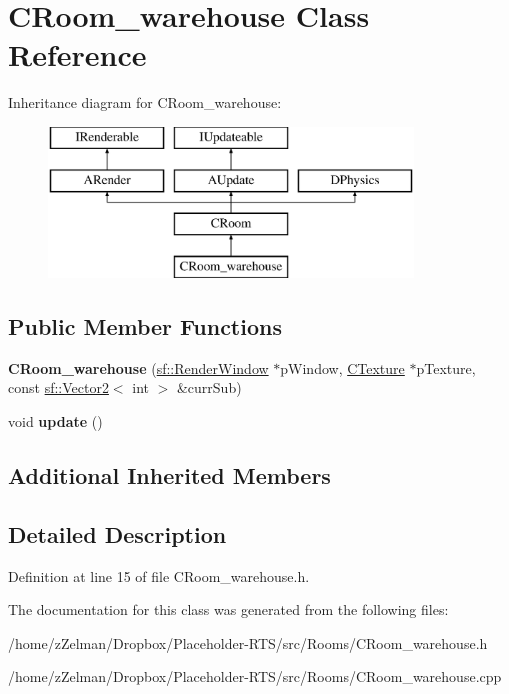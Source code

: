 \hypertarget{classCRoom__warehouse}{\section{C\-Room\-\_\-warehouse Class Reference}
\label{classCRoom__warehouse}
}
Inheritance diagram for C\-Room\-\_\-warehouse\-:\begin{figure}[H]
\begin{center}
\leavevmode
\includegraphics[height=4.000000cm]{classCRoom__warehouse}
\end{center}
\end{figure}
\subsection*{Public Member Functions}
\begin{DoxyCompactItemize}
\item 
\hypertarget{classCRoom__warehouse_a35f3177abad233838d301cee76d40901}{{\bfseries C\-Room\-\_\-warehouse} (\hyperlink{classsf_1_1RenderWindow}{sf\-::\-Render\-Window} $\ast$p\-Window, \hyperlink{classCTexture}{C\-Texture} $\ast$p\-Texture, const \hyperlink{classsf_1_1Vector2}{sf\-::\-Vector2}$<$ int $>$ \&curr\-Sub)}\label{classCRoom__warehouse_a35f3177abad233838d301cee76d40901}

\item 
\hypertarget{classCRoom__warehouse_ab4f3d3a87421ef23febd6f259341d4cd}{void {\bfseries update} ()}\label{classCRoom__warehouse_ab4f3d3a87421ef23febd6f259341d4cd}

\end{DoxyCompactItemize}
\subsection*{Additional Inherited Members}


\subsection{Detailed Description}


Definition at line 15 of file C\-Room\-\_\-warehouse.\-h.



The documentation for this class was generated from the following files\-:\begin{DoxyCompactItemize}
\item 
/home/z\-Zelman/\-Dropbox/\-Placeholder-\/\-R\-T\-S/src/\-Rooms/C\-Room\-\_\-warehouse.\-h\item 
/home/z\-Zelman/\-Dropbox/\-Placeholder-\/\-R\-T\-S/src/\-Rooms/C\-Room\-\_\-warehouse.\-cpp\end{DoxyCompactItemize}
